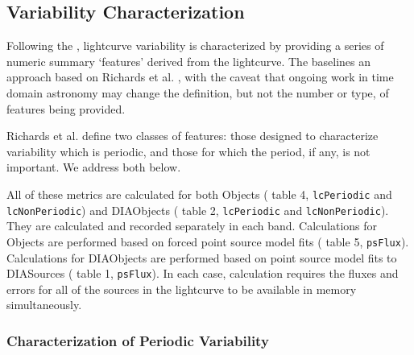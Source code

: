 \subsection{Variability Characterization}
\label{sec:acVariabilityCharacterization}

Following the \DPDD{}, lightcurve variability is characterized by providing a series of numeric summary `features' derived from the lightcurve. The \DPDD baselines an approach based on Richards et al. \cite{2011ApJ...733...10R}, with the caveat that ongoing work in time domain astronomy may change the definition, but not the number or type, of features being provided.

Richards et al. define two classes of features: those designed to characterize variability which is periodic, and those for which the period, if any, is not important. We address both below.

All of these metrics are calculated for both Objects (\DPDD{} table 4, \texttt{lcPeriodic} and \texttt{lcNonPeriodic}) and DIAObjects (\DPDD{} table 2, \texttt{lcPeriodic} and \texttt{lcNonPeriodic}). They are calculated and recorded separately in each band. Calculations for Objects are performed based on forced point source model fits (\DPDD{} table 5, \texttt{psFlux}).  Calculations for DIAObjects are performed based on point source model fits to DIASources (\DPDD{} table 1, \texttt{psFlux}). In each case, calculation requires the fluxes and errors for all of the sources in the lightcurve to be available in memory simultaneously.

\subsubsection{Characterization of Periodic Variability}

